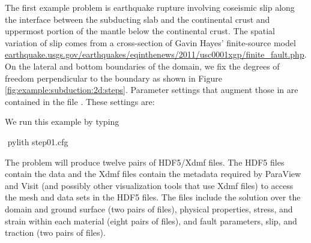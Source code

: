 


The first example problem is earthquake rupture involving coseismic
slip along the interface between the subducting slab and the continental
crust and uppermost portion of the mantle below the continental crust.
The spatial variation of slip comes from a cross-section of Gavin
Hayes' finite-source model \url{earthquake.usgs.gov/earthquakes/eqinthenews/2011/usc0001xgp/finite_fault.php}.
On the lateral and bottom boundaries of the domain, we fix the degrees
of freedom perpendicular to the boundary as shown in Figure \vref{fig:example:subduction:2d:steps}.
Parameter settings that augment those in  are
contained in the file . These settings are:
\begin{inventory}
\end{inventory}
We run this example by typing
\begin{shell}
$$ pylith step01.cfg
\end{shell}
The problem will produce twelve pairs of HDF5/Xdmf files. The HDF5
files contain the data and the Xdmf files contain the metadata required
by ParaView and Visit (and possibly other visualization tools that
use Xdmf files) to access the mesh and data sets in the HDF5 files.
The files include the solution over the domain and ground surface
(two pairs of files), physical properties, stress, and strain within
each material (eight pairs of files), and fault parameters, slip,
and traction (two pairs of files). 

